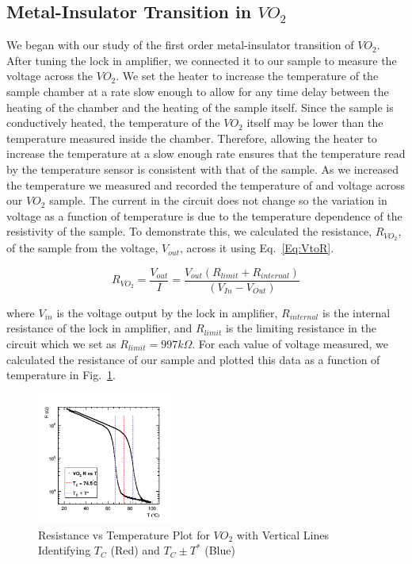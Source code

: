 \documentclass[%
 reprint,
 amsmath,amssymb,
 aps,
 pra,
]{revtex4-1}
\begin{document}
\subsection{Metal-Insulator Transition in $VO_{2}$}
We began with our study of the first order metal-insulator transition of $VO_{2}$. After tuning the lock in amplifier, we connected it to our sample to measure the voltage across the $VO_{2}$. We set the heater to increase the temperature of the sample chamber at a rate slow enough to allow for any time delay between the heating of the chamber and the heating of the sample itself. Since the sample is conductively heated, the temperature of the $VO_{2}$ itself may be lower than the temperature measured inside the chamber. Therefore, allowing the heater to increase the temperature at a slow enough rate ensures that the temperature read by the temperature sensor is consistent with that of the sample. As we increased the temperature we measured and recorded the temperature of and voltage across our $VO_{2}$ sample. The current in the circuit does not change so the variation in voltage as a function of temperature is due to the temperature dependence of the resistivity of the sample. To demonstrate this, we calculated the resistance, $R_{VO_{2}}$, of the sample from the voltage, $V_{out}$, across it using Eq.~\ref{Eq:VtoR}.

\begin{equation}\label{Eq:VtoR}
R_{VO_{2}} = \frac{V_{out}}{I} = \frac{V_{out} (R_{limit} + R_{internal})}{(V_{In} - V_{Out})} 
\end{equation}

where $V_{in}$ is the voltage output by the lock in amplifier, $R_{internal}$ is the internal resistance of the lock in amplifier, and $R_{limit}$ is the limiting resistance in the circuit which we set as $R_{limit} = 997 k\Omega$. For each value of voltage measured, we calculated the resistance of our sample and plotted this data as a function of temperature in Fig.~\ref{Fig:RvT1}.

\begin{figure}[H]
	\centering
	\includegraphics[width=0.4\textwidth]{VO2_RvT_withTC.png}
	\caption{Resistance vs Temperature Plot for $VO_{2}$ with Vertical Lines Identifying $T_{C}$ (Red) and $T_{C} \pm T^{*}$ (Blue)}
	\label{Fig:RvT1}
\end{figure}
\end{document}
